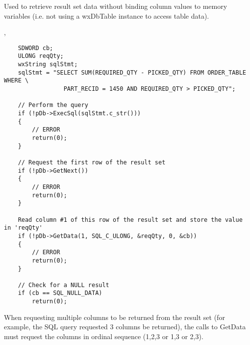 \label{wxdbgetdata}


Used to retrieve result set data without binding column values to memory variables (i.e. not using a wxDbTable instance to access table data).




, 

\begin{verbatim}
	SDWORD cb;
	ULONG reqQty;
	wxString sqlStmt;
	sqlStmt = "SELECT SUM(REQUIRED_QTY - PICKED_QTY) FROM ORDER_TABLE WHERE \
                 PART_RECID = 1450 AND REQUIRED_QTY > PICKED_QTY";

	// Perform the query
	if (!pDb->ExecSql(sqlStmt.c_str()))
	{
		// ERROR
		return(0);
	}

	// Request the first row of the result set
	if (!pDb->GetNext())
	{
		// ERROR
		return(0);
	}

	Read column #1 of this row of the result set and store the value in 'reqQty'
	if (!pDb->GetData(1, SQL_C_ULONG, &reqQty, 0, &cb))
	{
		// ERROR
		return(0);
	}

	// Check for a NULL result
	if (cb == SQL_NULL_DATA)
		return(0);
\end{verbatim}


When requesting multiple columns to be returned from the result set (for example, the SQL query
requested 3 columns be returned), the calls to GetData must request the columns in ordinal
sequence (1,2,3 or 1,3 or 2,3).  

\label{wxdbgetdatabasename}

